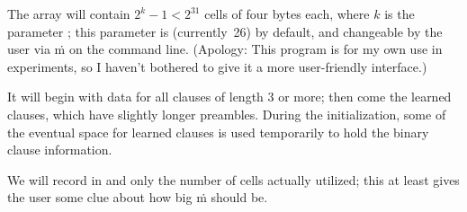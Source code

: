 The  array will contain $2^k-1<2^{31}$ cells of four bytes
each,
where $k$ is the parameter ; this parameter is
 (currently~26) by default, and changeable by the
user
via \.m on the command line. (Apology: This program is for my own use in
experiments, so I haven't bothered to give it a more user-friendly interface.)

It will begin with data for all clauses of length 3 or more;
then come the learned clauses, which have slightly longer preambles.
During the initialization, some of the eventual space for learned
clauses is used temporarily to hold the binary clause information.

We will record in  and  only the number
of cells actually
utilized; this at least gives the user some clue about how big \.m should be.

